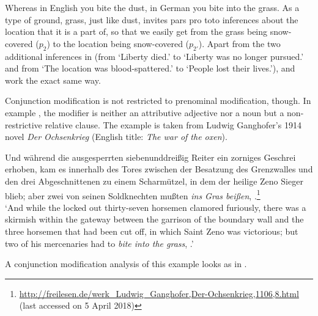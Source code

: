 \documentclass[output=paper]{langsci/langscibook}
\begin{document}
\noindent Whereas in English you bite the dust, in German you bite into the grass. As a type of ground, grass, just like dust, invites pars pro toto inferences about the location that it is a part of, so that we easily get from the grass being snow-covered ($p_{2}$) to the location being snow-covered ($p_{2'}$). Apart from the two additional inferences in  (from `Liberty died.' to `Liberty was no longer pursued.' and from `The location was blood-spattered.' to `People lost their lives.'),  and  work the exact same way.

Conjunction modification is not restricted to prenominal modification, though. In example , the modifier is neither an attributive adjective nor a noun but a non-restrictive relative clause. The example is taken from Ludwig Ganghofer's 1914 novel \textit{Der Ochsenkrieg} (English title: \textit{The war of the oxen}).

\ea \label{hardly visible grass}
Und während die ausgesperrten siebenunddreißig Reiter ein zorniges Ge\-schrei erhoben, kam es innerhalb des Tores zwischen der Besatzung des Grenzwalles und den drei Abgeschnittenen zu einem Scharmützel, in dem der heilige Zeno Sieger blieb; aber zwei von seinen Soldknechten mußten \textit{ins Gras beißen}, \underline{}.\footnote{\url{http://freilesen.de/werk_Ludwig_Ganghofer,Der-Ochsenkrieg,1106,8.html}
(last accessed on 5 April 2018)}\\
\glt `And while the locked out thirty-seven horsemen clamored furiously, there was a skirmish within the gateway between the garrison of the boundary wall and the three horsemen that had been cut off, in which Saint Zeno was victorious; but two of his mercenaries had to \textit{bite into the grass}, \underline{}.'
\z

\noindent A conjunction modification analysis of this example looks as in .
\end{document}
